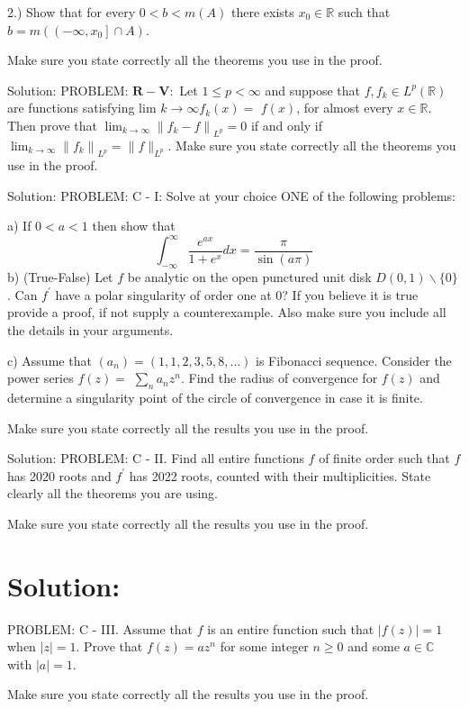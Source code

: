 \documentclass[10pt]{article}
\begin{document}
2.) Show that for every $0<b<m(A)$ there exists $x_{0} \in \mathbb{R}$ such that $b=m\left(\left(-\infty, x_{0}\right] \cap A\right)$.

Make sure you state correctly all the theorems you use in the proof.

Solution: PROBLEM: $\mathbf{R}-\mathbf{V}:$ Let $1 \leq p<\infty$ and suppose that $f, f_{k} \in L^{p}(\mathbb{R})$ are functions satisfying lim $k \rightarrow \infty f_{k}(x)=$ $f(x)$, for almost every $x \in \mathbb{R}$. Then prove that $\lim _{k \rightarrow \infty}\left\|f_{k}-f\right\|_{L^{p}}=0$ if and only if $\lim _{k \rightarrow \infty}\left\|f_{k}\right\|_{L^{p}}=\|f\|_{L^{p}}$. Make sure you state correctly all the theorems you use in the proof.

Solution: PROBLEM: C - I: Solve at your choice ONE of the following problems:

a) If $0<a<1$ then show that
$$
\int_{-\infty}^{\infty} \frac{e^{a x}}{1+e^{x}} d x=\frac{\pi}{\sin (a \pi)}
$$
b) (True-False) Let $f$ be analytic on the open punctured unit disk $D(0,1) \backslash\{0\}$. Can $f^{\prime}$ have a polar singularity of order one at 0? If you believe it is true provide a proof, if not supply a counterexample. Also make sure you include all the details in your arguments.

c) Assume that $\left(a_{n}\right)=(1,1,2,3,5,8, \ldots)$ is Fibonacci sequence. Consider the power series $f(z)=$ $\sum_{n} a_{n} z^{n}$. Find the radius of convergence for $f(z)$ and determine a singularity point of the circle of convergence in case it is finite.

Make sure you state correctly all the results you use in the proof.

Solution: PROBLEM: C - II. Find all entire functions $f$ of finite order such that $f$ has 2020 roots and $f^{\prime}$ has 2022 roots, counted with their multiplicities. State clearly all the theorems you are using.

Make sure you state correctly all the results you use in the proof.

\section{Solution:}
PROBLEM: C - III. Assume that $f$ is an entire function such that $|f(z)|=1$ when $|z|=1$. Prove that $f(z)=a z^{n}$ for some integer $n \geq 0$ and some $a \in \mathbb{C}$ with $|a|=1$.

Make sure you state correctly all the results you use in the proof.
\end{document}
